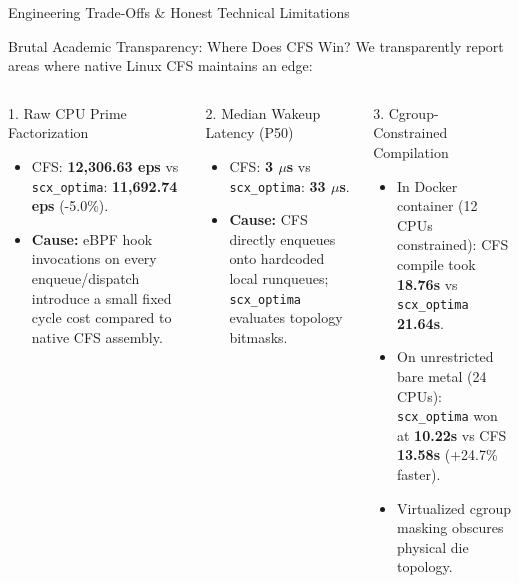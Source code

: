 \documentclass{beamer}
\begin{document}
\begin{frame}{Engineering Trade-Offs \& Honest Technical Limitations}
  \begin{alertblock}{Brutal Academic Transparency: Where Does CFS Win?}
    \footnotesize
    We transparently report areas where native Linux CFS maintains an edge:
  \end{alertblock}

  \vspace{0.15cm}
  \begin{columns}[T]
      \begin{block}{\small 1. Raw CPU Prime Factorization}
        \tiny
        \begin{itemize}\itemsep2pt
          \item CFS: \textbf{12,306.63 eps} vs \texttt{scx\_optima}: \textbf{11,692.74 eps} (-5.0\%).
          \item \textbf{Cause:} eBPF hook invocations on every enqueue/dispatch introduce a small fixed cycle cost compared to native CFS assembly.
        \end{itemize}
      \end{block}

      \begin{block}{\small 2. Median Wakeup Latency (P50)}
        \tiny
        \begin{itemize}\itemsep2pt
          \item CFS: \textbf{3 $\mu$s} vs \texttt{scx\_optima}: \textbf{33 $\mu$s}.
          \item \textbf{Cause:} CFS directly enqueues onto hardcoded local runqueues; \texttt{scx\_optima} evaluates topology bitmasks.
        \end{itemize}
      \end{block}

      \begin{exampleblock}{\small 3. Cgroup-Constrained Compilation}
        \tiny
        \begin{itemize}\itemsep2pt
          \item In Docker container (12 CPUs constrained): CFS compile took \textbf{18.76s} vs \texttt{scx\_optima} \textbf{21.64s}.
          \item On unrestricted bare metal (24 CPUs): \texttt{scx\_optima} won at \textbf{10.22s} vs CFS \textbf{13.58s} (+24.7\% faster).
          \item Virtualized cgroup masking obscures physical die topology.
        \end{itemize}
      \end{exampleblock}
  \end{columns}
\end{frame}
\end{document}
